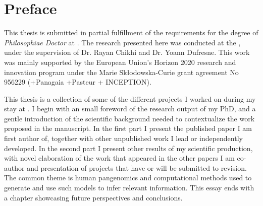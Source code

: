 \chapter{Preface}
This thesis is submitted in partial fulfillment of the requirements for the degree of \emph{Philosophiae Doctor} at \sorbonne.
The research presented here was conducted at the \pasteur, under the supervision of Dr. Rayan Chikhi and Dr. Yoann Dufresne.
This work was mainly supported by the European Union’s Horizon 2020 research and innovation program under the Marie Skłodowska-Curie grant agreement No \num{956229} (+Panagaia +Pasteur + INCEPTION).

This thesis is a collection of some of the different projects I worked on during my stay at \pasteur. I begin with an small foreword of the research output of my PhD, and a gentle introduction of the scientific background needed to contextualize the work proposed in the manuscript. In the first part I present the published paper I am first author of, together with other unpublished work I lead or independently developed. In the second part I present other results of my scientific production, with novel elaboration of the work that appeared in the other papers I am co-author and presentation of projects that have or will be submitted to revision.
The common theme is human pangenomics and computational methods used to generate and use such models to infer relevant information.  
This essay ends with a chapter showcasing future perspectives and conclusions.

